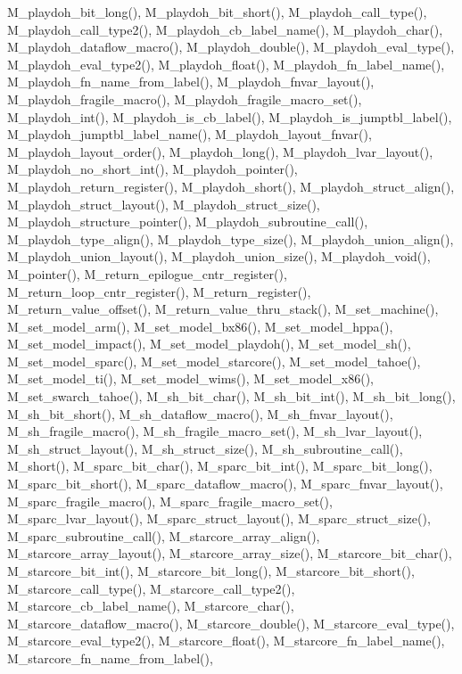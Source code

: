 M\_\-playdoh\_\-bit\_\-long(), M\_\-playdoh\_\-bit\_\-short(), M\_\-playdoh\_\-call\_\-type(), M\_\-playdoh\_\-call\_\-type2(), M\_\-playdoh\_\-cb\_\-label\_\-name(), M\_\-playdoh\_\-char(), M\_\-playdoh\_\-dataflow\_\-macro(), M\_\-playdoh\_\-double(), M\_\-playdoh\_\-eval\_\-type(), M\_\-playdoh\_\-eval\_\-type2(), M\_\-playdoh\_\-float(), M\_\-playdoh\_\-fn\_\-label\_\-name(), M\_\-playdoh\_\-fn\_\-name\_\-from\_\-label(), M\_\-playdoh\_\-fnvar\_\-layout(), M\_\-playdoh\_\-fragile\_\-macro(), M\_\-playdoh\_\-fragile\_\-macro\_\-set(), M\_\-playdoh\_\-int(), M\_\-playdoh\_\-is\_\-cb\_\-label(), M\_\-playdoh\_\-is\_\-jumptbl\_\-label(), M\_\-playdoh\_\-jumptbl\_\-label\_\-name(), M\_\-playdoh\_\-layout\_\-fnvar(), M\_\-playdoh\_\-layout\_\-order(), M\_\-playdoh\_\-long(), M\_\-playdoh\_\-lvar\_\-layout(), M\_\-playdoh\_\-no\_\-short\_\-int(), M\_\-playdoh\_\-pointer(), M\_\-playdoh\_\-return\_\-register(), M\_\-playdoh\_\-short(), M\_\-playdoh\_\-struct\_\-align(), M\_\-playdoh\_\-struct\_\-layout(), M\_\-playdoh\_\-struct\_\-size(), M\_\-playdoh\_\-structure\_\-pointer(), M\_\-playdoh\_\-subroutine\_\-call(), M\_\-playdoh\_\-type\_\-align(), M\_\-playdoh\_\-type\_\-size(), M\_\-playdoh\_\-union\_\-align(), M\_\-playdoh\_\-union\_\-layout(), M\_\-playdoh\_\-union\_\-size(), M\_\-playdoh\_\-void(), M\_\-pointer(), M\_\-return\_\-epilogue\_\-cntr\_\-register(), M\_\-return\_\-loop\_\-cntr\_\-register(), M\_\-return\_\-register(), M\_\-return\_\-value\_\-offset(), M\_\-return\_\-value\_\-thru\_\-stack(), M\_\-set\_\-machine(), M\_\-set\_\-model\_\-arm(), M\_\-set\_\-model\_\-bx86(), M\_\-set\_\-model\_\-hppa(), M\_\-set\_\-model\_\-impact(), M\_\-set\_\-model\_\-playdoh(), M\_\-set\_\-model\_\-sh(), M\_\-set\_\-model\_\-sparc(), M\_\-set\_\-model\_\-starcore(), M\_\-set\_\-model\_\-tahoe(), M\_\-set\_\-model\_\-ti(), M\_\-set\_\-model\_\-wims(), M\_\-set\_\-model\_\-x86(), M\_\-set\_\-swarch\_\-tahoe(), M\_\-sh\_\-bit\_\-char(), M\_\-sh\_\-bit\_\-int(), M\_\-sh\_\-bit\_\-long(), M\_\-sh\_\-bit\_\-short(), M\_\-sh\_\-dataflow\_\-macro(), M\_\-sh\_\-fnvar\_\-layout(), M\_\-sh\_\-fragile\_\-macro(), M\_\-sh\_\-fragile\_\-macro\_\-set(), M\_\-sh\_\-lvar\_\-layout(), M\_\-sh\_\-struct\_\-layout(), M\_\-sh\_\-struct\_\-size(), M\_\-sh\_\-subroutine\_\-call(), M\_\-short(), M\_\-sparc\_\-bit\_\-char(), M\_\-sparc\_\-bit\_\-int(), M\_\-sparc\_\-bit\_\-long(), M\_\-sparc\_\-bit\_\-short(), M\_\-sparc\_\-dataflow\_\-macro(), M\_\-sparc\_\-fnvar\_\-layout(), M\_\-sparc\_\-fragile\_\-macro(), M\_\-sparc\_\-fragile\_\-macro\_\-set(), M\_\-sparc\_\-lvar\_\-layout(), M\_\-sparc\_\-struct\_\-layout(), M\_\-sparc\_\-struct\_\-size(), M\_\-sparc\_\-subroutine\_\-call(), M\_\-starcore\_\-array\_\-align(), M\_\-starcore\_\-array\_\-layout(), M\_\-starcore\_\-array\_\-size(), M\_\-starcore\_\-bit\_\-char(), M\_\-starcore\_\-bit\_\-int(), M\_\-starcore\_\-bit\_\-long(), M\_\-starcore\_\-bit\_\-short(), M\_\-starcore\_\-call\_\-type(), M\_\-starcore\_\-call\_\-type2(), M\_\-starcore\_\-cb\_\-label\_\-name(), M\_\-starcore\_\-char(), M\_\-starcore\_\-dataflow\_\-macro(), M\_\-starcore\_\-double(), M\_\-starcore\_\-eval\_\-type(), M\_\-starcore\_\-eval\_\-type2(), M\_\-starcore\_\-float(), M\_\-starcore\_\-fn\_\-label\_\-name(), M\_\-starcore\_\-fn\_\-name\_\-from\_\-label(), 